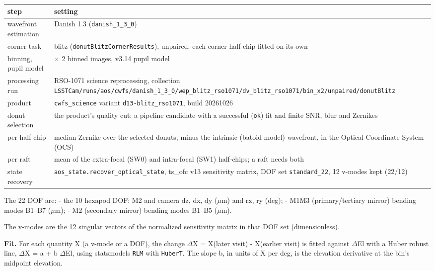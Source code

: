 { %
\begin{longtable}[]{@{}
  >{\raggedright\arraybackslash}p{}
  >{\raggedright\arraybackslash}p{}@{}}
\toprule\noalign{}
\begin{minipage}[b]{\linewidth}\raggedright
step
\end{minipage} & \begin{minipage}[b]{\linewidth}\raggedright
setting
\end{minipage} \\
\midrule\noalign{}
\endhead
\bottomrule\noalign{}
\endlastfoot
wavefront estimation & Danish 1.3 (\texttt{danish\_1\_3\_0}) \\
corner task & blitz (\texttt{donutBlitzCornerResults}), unpaired: each
corner half-chip fitted on its own \\
binning, pupil model & 2 $\times$ 2 binned images, v3.14 pupil model \\
processing run & RSO-1071 science reprocessing, collection
\texttt{LSSTCam/runs/aos/cwfs/danish\_1\_3\_0/wep\_blitz\_rso1071/dv\_blitz\_rso1071/bin\_x2/unpaired/donutBlitz} \\
product & \texttt{cwfs\_science} variant \texttt{d13-blitz\_rso1071},
build 20261026 \\
donut selection & the product's quality cut: a pipeline candidate with a
successful (\texttt{ok}) fit and finite SNR, blur and Zernikes \\
per half-chip & median Zernike over the selected donuts, minus the
intrinsic (batoid model) wavefront, in the Optical Coordinate System
(OCS) \\
per raft & mean of the extra-focal (SW0) and intra-focal (SW1)
half-chips; a raft needs both \\
state recovery & \texttt{aos\_state.recover\_optical\_state}, ts\_ofc
v13 sensitivity matrix, DOF set \texttt{standard\_22}, 12 v-modes kept
(22/12) \\
\end{longtable}
}

The 22 DOF are: - the 10 hexapod DOF: M2 and camera dz, dx, dy ($\mu$m) and
rx, ry (deg); - M1M3 (primary/tertiary mirror) bending modes B1--B7
($\mu$m); - M2 (secondary mirror) bending modes B1--B5 ($\mu$m).

The v-modes are the 12 singular vectors of the normalized sensitivity
matrix in that DOF set (dimensionless).

\textbf{Fit.} For each quantity X (a v-mode or a DOF), the change $\Delta$X =
X(later visit) - X(earlier visit) is fitted against $\Delta$El with a Huber
robust line, $\Delta$X = a + b $\Delta$El, using statsmodels \texttt{RLM} with
\texttt{HuberT}. The slope b, in units of X per deg, is the elevation
derivative at the bin's midpoint elevation.

